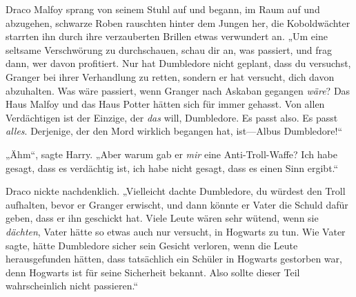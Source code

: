 Draco Malfoy sprang von seinem Stuhl auf und begann, im Raum auf und abzugehen, schwarze Roben rauschten hinter dem Jungen her, die Koboldwächter starrten ihn durch ihre verzauberten Brillen etwas verwundert an.
„Um eine seltsame Verschwörung zu durchschauen, schau dir an, was passiert, und frag dann, wer davon profitiert. Nur hat Dumbledore nicht geplant, dass du versuchst, Granger bei ihrer Verhandlung zu retten, sondern er hat versucht, dich davon abzuhalten. Was wäre passiert, wenn Granger nach Askaban gegangen \emph{wäre}? Das Haus Malfoy und das Haus Potter hätten sich für immer gehasst. Von allen Verdächtigen ist der Einzige, der \emph{das} will, Dumbledore. Es passt also. Es passt \emph{alles}. Derjenige, der den Mord wirklich begangen hat, ist—Albus Dumbledore!“

„Ähm“, sagte Harry. „Aber warum gab er \emph{mir} eine Anti-Troll-Waffe? Ich habe gesagt, dass es verdächtig ist, ich habe nicht gesagt, dass es einen Sinn ergibt.“

Draco nickte nachdenklich.
„Vielleicht dachte Dumbledore, du würdest den Troll aufhalten, bevor er Granger erwischt, und dann könnte er Vater die Schuld dafür geben, dass er ihn geschickt hat. Viele Leute wären sehr wütend, wenn sie \emph{dächten}, Vater hätte so etwas auch nur versucht, in Hogwarts zu tun. Wie Vater sagte, hätte Dumbledore sicher sein Gesicht verloren, wenn die Leute herausgefunden hätten, dass tatsächlich ein Schüler in Hogwarts gestorben war, denn Hogwarts ist für seine Sicherheit bekannt. Also sollte dieser Teil wahrscheinlich nicht passieren.“

